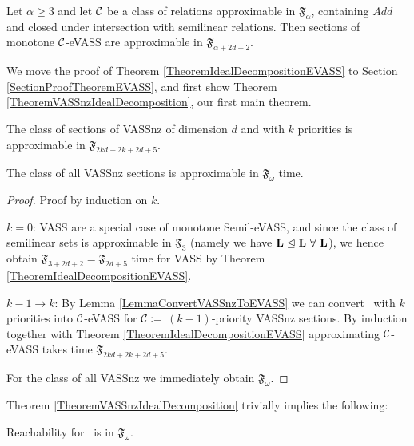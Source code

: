 \begin{theorem} \label{TheoremIdealDecompositionEVASS}
Let \(\alpha \geq 3\) and let \(\mathcal{C}\) be a class of relations approximable in \(\mathfrak{F}_{\alpha}\), containing \(Add\) and closed under intersection with semilinear relations. Then sections of monotone \(\mathcal{C}\)-eVASS are approximable in \(\mathfrak{F}_{\alpha+2d+2}\).
\end{theorem}

We move the proof of Theorem \ref{TheoremIdealDecompositionEVASS} to Section \ref{SectionProofTheoremEVASS}, and first show Theorem \ref{TheoremVASSnzIdealDecomposition}, our first main theorem.

\begin{theorem} \label{TheoremVASSnzIdealDecomposition}
The class of sections of VASSnz of dimension \(d\) and with \(k\) priorities is approximable in \(\mathfrak{F}_{2kd+2k+2d+5}\). 

The class of all VASSnz sections is approximable in \(\mathfrak{F}_{\omega}\) time.
\end{theorem}

\begin{proof}
Proof by induction on \(k\).

\(k=0\): VASS are a special case of monotone Semil-eVASS, and since the class of semilinear sets is approximable in \(\mathfrak{F}_3\) (namely we have \(\mathbf{L} \trianglelefteq \mathbf{L}\ \forall\ \mathbf{L}\)), we hence obtain \(\mathfrak{F}_{3+2d+2}=\mathfrak{F}_{2d+5}\) time for VASS by Theorem \ref{TheoremIdealDecompositionEVASS}.

\(k-1 \to k\): By Lemma \ref{LemmaConvertVASSnzToEVASS} we can convert \ConsideredModel\ with \(k\) priorities into \(\mathcal{C}\)-eVASS for \(\mathcal{C}:=\) \((k-1)\)-priority VASSnz sections. By induction together with Theorem \ref{TheoremIdealDecompositionEVASS} approximating \(\mathcal{C}\)-eVASS takes time \(\mathfrak{F}_{2kd+2k+2d+5}\).

For the class of all VASSnz we immediately obtain \(\mathfrak{F}_{\omega}\).
\end{proof}

Theorem \ref{TheoremVASSnzIdealDecomposition} trivially implies the following:

\begin{corollary}
Reachability for \ConsideredModel \ is in \(\mathfrak{F}_{\omega}\).
\end{corollary}

